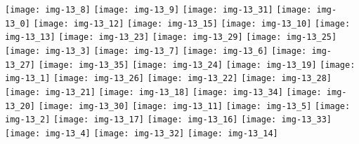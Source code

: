 \documentclass[a4paper]{article}
\begin{document}
	\texttt{[image: img-13\_8]}
	\texttt{[image: img-13\_9]}
	\texttt{[image: img-13\_31]}
	\texttt{[image: img-13\_0]}
	\texttt{[image: img-13\_12]}
	\texttt{[image: img-13\_15]}
	\texttt{[image: img-13\_10]}
	\texttt{[image: img-13\_13]}
	\texttt{[image: img-13\_23]}
	\texttt{[image: img-13\_29]}
	\texttt{[image: img-13\_25]}
	\texttt{[image: img-13\_3]}
	\texttt{[image: img-13\_7]}
	\texttt{[image: img-13\_6]}
	\texttt{[image: img-13\_27]}
	\texttt{[image: img-13\_35]}
	\texttt{[image: img-13\_24]}
	\texttt{[image: img-13\_19]}
	\texttt{[image: img-13\_1]}
	\texttt{[image: img-13\_26]}
	\texttt{[image: img-13\_22]}
	\texttt{[image: img-13\_28]}
	\texttt{[image: img-13\_21]}
	\texttt{[image: img-13\_18]}
	\texttt{[image: img-13\_34]}
	\texttt{[image: img-13\_20]}
	\texttt{[image: img-13\_30]}
	\texttt{[image: img-13\_11]}
	\texttt{[image: img-13\_5]}
	\texttt{[image: img-13\_2]}
	\texttt{[image: img-13\_17]}
	\texttt{[image: img-13\_16]}
	\texttt{[image: img-13\_33]}
	\texttt{[image: img-13\_4]}
	\texttt{[image: img-13\_32]}
	\texttt{[image: img-13\_14]}
\end{document}
